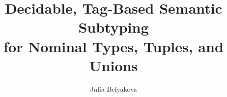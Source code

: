 \documentclass[sigplan,review]{acmart}\settopmatter{printfolios=true,printccs=false,printacmref=false}
\begin{document}
\title[Tag-Based Semantic Subtyping]{Decidable, Tag-Based Semantic Subtyping \\
	for Nominal Types, Tuples, and Unions}



\author{Julia Belyakova}
\end{document}
